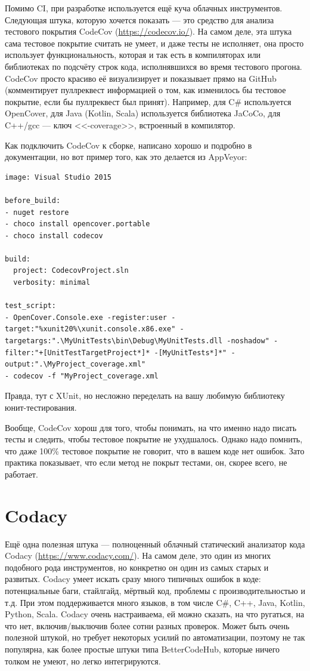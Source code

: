 \documentclass{../../text-style}
\begin{document}
Помимо CI, при разработке используется ещё куча облачных инструментов. Следующая штука, которую хочется показать --- это средство для анализа тестового покрытия CodeCov (\url{https://codecov.io/}). На самом деле, эта штука сама тестовое покрытие считать не умеет, и даже тесты не исполняет, она просто использует функциональность, которая и так есть в компиляторах или библиотеках по подсчёту строк кода, исполнявшихся во время тестового прогона. CodeCov просто красиво её визуализирует и показывает прямо на GitHub (комментирует пуллреквест информацией о том, как изменилось бы тестовое покрытие, если бы пуллреквест был принят). Например, для C\# используется OpenCover, для Java (Kotlin, Scala) используется библиотека JaCoCo, для C++/gcc --- ключ <<-coverage>>, встроенный в компилятор.

Как подключить CodeCov к сборке, написано хорошо и подробно в документации, но вот пример того, как это делается из AppVeyor:

\begin{verbatim}
image: Visual Studio 2015

before_build:
- nuget restore
- choco install opencover.portable
- choco install codecov

build:
  project: CodecovProject.sln
  verbosity: minimal

test_script:
- OpenCover.Console.exe -register:user -target:"%xunit20%\xunit.console.x86.exe" -targetargs:".\MyUnitTests\bin\Debug\MyUnitTests.dll -noshadow" -filter:"+[UnitTestTargetProject*]* -[MyUnitTests*]*" -output:".\MyProject_coverage.xml"
- codecov -f "MyProject_coverage.xml
\end{verbatim}

Правда, тут с XUnit, но несложно переделать на вашу любимую библиотеку юнит-тестирования.

Вообще, CodeCov хорош для того, чтобы понимать, на что именно надо писать тесты и следить, чтобы тестовое покрытие не ухудшалось. Однако надо помнить, что даже 100\% тестовое покрытие не говорит, что в вашем коде нет ошибок. Зато практика показывает, что если метод не покрыт тестами, он, скорее всего, не работает.

\section{Codacy}

Ещё одна полезная штука --- полноценный облачный статический анализатор кода Codacy (\url{https://www.codacy.com/}). На самом деле, это один из многих подобного рода инструментов, но конкретно он один из самых старых и развитых. Codacy умеет искать сразу много типичных ошибок в коде: потенциальные баги, стайлгайд, мёртвый код, проблемы с производительностью и т.д. При этом поддерживается много языков, в том числе C\#, C++, Java, Kotlin, Python, Scala. Codacy очень настраиваема, ей можно сказать, на что ругаться, на что нет, включив/выключив более сотни разных проверок. Может быть очень полезной штукой, но требует некоторых усилий по автоматизации, поэтому не так популярна, как более простые штуки типа BetterCodeHub, которые ничего толком не умеют, но легко интегрируются.
\end{document}

